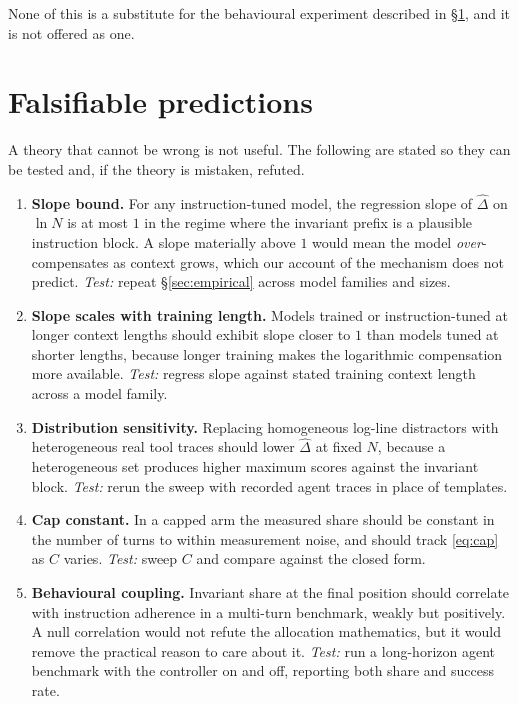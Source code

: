 \documentclass[11pt,a4paper]{article}
\theoremstyle{plain}
\theoremstyle{definition}
\theoremstyle{remark}
\begin{document}
None of this is a substitute for the behavioural experiment described in
\S\ref{sec:predictions}, and it is not offered as one.

\section{Falsifiable predictions}
\label{sec:predictions}

A theory that cannot be wrong is not useful. The following are stated so they
can be tested and, if the theory is mistaken, refuted.

\begin{enumerate}[label=\textbf{P\arabic*.}, leftmargin=*]
  \item \textbf{Slope bound.} For any instruction-tuned model, the regression
        slope of $\hat{\Delta}$ on $\ln N$ is at most $1$ in the regime where
        the invariant prefix is a plausible instruction block. A slope
        materially above $1$ would mean the model \emph{over}-compensates as
        context grows, which our account of the mechanism does not predict.
        \emph{Test:} repeat \S\ref{sec:empirical} across model families and
        sizes.

  \item \textbf{Slope scales with training length.} Models trained or
        instruction-tuned at longer context lengths should exhibit slope closer
        to $1$ than models tuned at shorter lengths, because longer training
        makes the logarithmic compensation more available.
        \emph{Test:} regress slope against stated training context length across
        a model family.

  \item \textbf{Distribution sensitivity.} Replacing homogeneous log-line
        distractors with heterogeneous real tool traces should lower
        $\hat{\Delta}$ at fixed $N$, because a heterogeneous set produces higher
        maximum scores against the invariant block.
        \emph{Test:} rerun the sweep with recorded agent traces in place of
        templates.

  \item \textbf{Cap constant.} In a capped arm the measured share should be
        constant in the number of turns to within measurement noise, and should
        track \eqref{eq:cap} as $C$ varies.
        \emph{Test:} sweep $C$ and compare against the closed form.

  \item \textbf{Behavioural coupling.} Invariant share at the final position
        should correlate with instruction adherence in a multi-turn benchmark,
        weakly but positively. A null correlation would not refute the
        allocation mathematics, but it would remove the practical reason to care
        about it.
        \emph{Test:} run a long-horizon agent benchmark with the controller on
        and off, reporting both share and success rate.
\end{enumerate}
\end{document}
